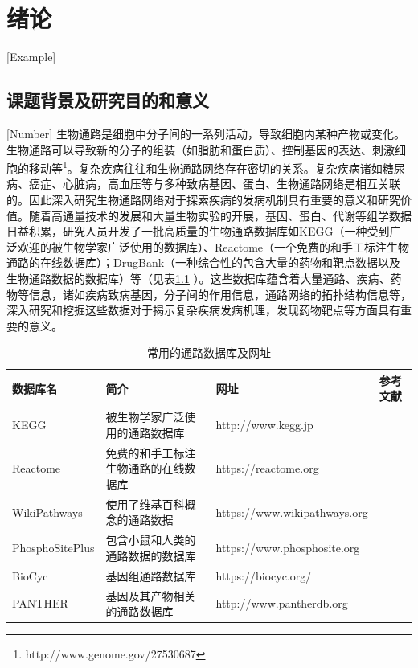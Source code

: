 \chapter{绪论}[Example]

\section{课题背景及研究目的和意义}[Number]
生物通路是细胞中分子间的一系列活动，导致细胞内某种产物或变化。生物通路可以导致新的分子的组装（如脂肪和蛋白质）、控制基因的表达、刺激细胞的移动等\footnote{http://www.genome.gov/27530687}。复杂疾病往往和生物通路网络存在密切的关系。复杂疾病诸如糖尿病、癌症、心脏病，高血压等与多种致病基因、蛋白、生物通路网络是相互关联的\cite{jin2011systematic}。因此深入研究生物通路网络对于探索疾病的发病机制具有重要的意义和研究价值。随着高通量技术的发展和大量生物实验的开展，基因、蛋白、代谢等组学数据日益积累，研究人员开发了一批高质量的生物通路数据库如KEGG\cite{kanehisa2008kegg}（一种受到广泛欢迎的被生物学家广泛使用的数据库）、Reactome\cite{croft2013reactome}（一个免费的和手工标注生物通路的在线数据库）；DrugBank\cite{wishart2006drugbank}（一种综合性的包含大量的药物和靶点数据以及生物通路数据的数据库）等（见表\ref{table1} ）。这些数据库蕴含着大量通路、疾病、药物等信息，诸如疾病致病基因，分子间的作用信息，通路网络的拓扑结构信息等，深入研究和挖掘这些数据对于揭示复杂疾病发病机理，发现药物靶点等方面具有重要的意义。

\begin{table}[htbp]
  \centering
	\caption[table1]{常用的通路数据库及网址}
\vspace{0.5em}\wuhao
\begin{tabularx}{1.0\textwidth}{lXXl}
\toprule[1.5pt]
数据库名 & 简介 & 网址 & 参考文献\\
\midrule[1pt]
KEGG & 被生物学家广泛使用的通路数据库 & http://www.kegg.jp & \cite{kanehisa2008kegg} \\
Reactome	& 免费的和手工标注生物通路的在线数据库	& https://reactome.org & \cite{croft2013reactome} \\
WikiPathways	& 使用了维基百科概念的通路数据	& https://www.wikipathways.org & \cite{pico2008wikipathways} \\
PhosphoSitePlus	& 包含小鼠和人类的通路数据的数据库 & https://www.phosphosite.org &	\cite{hornbeck2011phosphositeplus} \\
BioCyc 	& 基因组通路数据库& https://biocyc.org/	& \cite{krummenacker2005querying} \\
PANTHER	& 基因及其产物相关的通路数据库&http://www.pantherdb.org	& \cite{mi2016panther} \\
\bottomrule[1.5pt]
\end{tabularx}
\label{table1}
\end{table}

